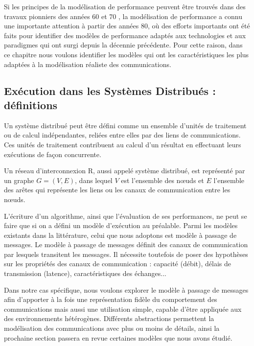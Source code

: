 Si les principes de la modélisation de performance peuvent être trouvés
dans des travaux pionniers des années 60 et 70 \cite{Peterson81},
la modélisation de performance a connu une importante attention à
partir des années 80, où des efforts importants ont été faits pour
identifier des modèles de performance adaptés aux technologies et aux
paradigmes qui ont surgi depuis la décennie précédente. Pour cette
raison, dans ce chapitre nous voulons identifier les modèles qui ont les caractéristiques
les plus adaptées à la modélisation réaliste des communications.


\subsection{Exécution dans les Systèmes Distribués : définitions}

Un système distribué peut être défini comme un ensemble
d'unités de traitement ou de calcul indépendantes, reliées entre elles
par des liens de communications. Ces unités de traitement contribuent
au calcul d'un résultat en effectuant leurs exécutions de façon
concurrente.

Un réseau d'interconnexion {\cal R}, aussi appelé système distribué,
est représenté par un graphe $G =(V,E)$, dans lequel $V$ est
l'ensemble des n{\oe}uds et $E$ l'ensemble des arêtes qui représente  les
liens ou les canaux de communication entre les n{\oe}uds.


L'écriture d'un algorithme, ainsi que l'évaluation de ses
performances, ne peut se faire que si on a défini un
modèle d'exécution au préalable. Parmi les modèles existants dans la littérature,  celui que nous adoptons est modèle à passage de messages. Le modèle à passage de messages définit des canaux de communication
par lesquels transitent les messages. Il nécessite toutefois de poser des
hypothèses sur les propriétés des canaux de communication : capacité (débit),
délais de transmission (latence), caractéristiques des échanges...

Dans notre cas spécifique, nous voulons explorer le modèle à passage de messages afin d'apporter à la fois une
représentation fidèle du comportement des communications mais aussi une 
utilisation simple, capable d'être appliquée aux des environnements hétérogènes. Différents abstractions permettent la modélisation des communications avec plus ou moins de détails, ainsi la prochaine section passera en revue certaines modèles que nous avons étudié.


